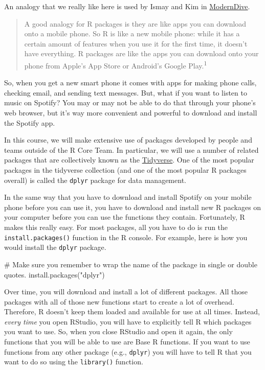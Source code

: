 \documentclass[
  letterpaper,
  DIV=11,
  numbers=noendperiod]{scrreprt}
\newenvironment{Shaded}{\begin{snugshade}}{\end{snugshade}}
\newcommand{\CommentTok}[1]{\textcolor[rgb]{0.37,0.37,0.37}{#1}}
\newcommand{\FunctionTok}[1]{\textcolor[rgb]{0.28,0.35,0.67}{#1}}
\newcommand{\NormalTok}[1]{\textcolor[rgb]{0.00,0.23,0.31}{#1}}
\newcommand{\StringTok}[1]{\textcolor[rgb]{0.13,0.47,0.30}{#1}}
\begin{document}
An analogy that we really like here is used by Ismay and Kim in
\href{https://moderndive.com/1-getting-started.html\#packages}{ModernDive}.

\begin{quote}
A good analogy for R packages is they are like apps you can download
onto a mobile phone. So R is like a new mobile phone: while it has a
certain amount of features when you use it for the first time, it
doesn't have everything. R packages are like the apps you can download
onto your phone from Apple's App Store or Android's Google
Play.\textsuperscript{1}
\end{quote}

So, when you get a new smart phone it comes with apps for making phone
calls, checking email, and sending text messages. But, what if you want
to listen to music on Spotify? You may or may not be able to do that
through your phone's web browser, but it's way more convenient and
powerful to download and install the Spotify app.

In this course, we will make extensive use of packages developed by
people and teams outside of the R Core Team. In particular, we will use
a number of related packages that are collectively known as the
\href{https://www.tidyverse.org/}{Tidyverse}. One of the most popular
packages in the tidyverse collection (and one of the most popular R
packages overall) is called the \texttt{dplyr} package for data
management.

In the same way that you have to download and install Spotify on your
mobile phone before you can use it, you have to download and install new
R packages on your computer before you can use the functions they
contain. Fortunately, R makes this really easy. For most packages, all
you have to do is run the \texttt{install.packages()} function in the R
console. For example, here is how you would install the \texttt{dplyr}
package.

\begin{Shaded}
\begin{Highlighting}[]
\CommentTok{\# Make sure you remember to wrap the name of the package in single or double quotes.}
\FunctionTok{install.packages}\NormalTok{(}\StringTok{"dplyr"}\NormalTok{)}
\end{Highlighting}
\end{Shaded}

Over time, you will download and install a lot of different packages.
All those packages with all of those new functions start to create a lot
of overhead. Therefore, R doesn't keep them loaded and available for use
at all times. Instead, \emph{every time} you open RStudio, you will have
to explicitly tell R which packages you want to use. So, when you close
RStudio and open it again, the only functions that you will be able to
use are Base R functions. If you want to use functions from any other
package (e.g., \texttt{dplyr}) you will have to tell R that you want to
do so using the \texttt{library()} function.
\end{document}
